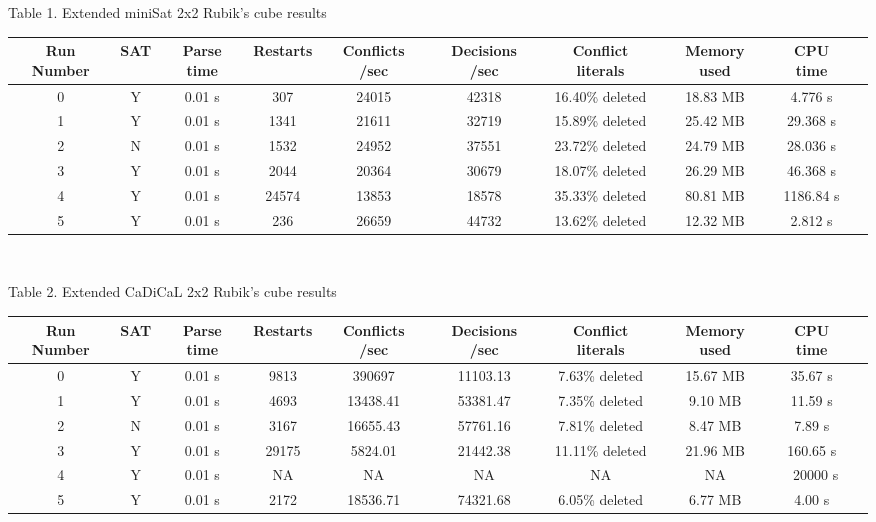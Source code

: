 \documentclass{article}
\begin{document}
\begin{center}
Table 1. Extended miniSat 2x2 Rubik's cube results \\[1mm]
\end{center}
\begin{adjustwidth}{-3.5cm}{}
\begin{tabular}{|c|c|c|c|c|c|c|c|c|c|}
\hline
Run Number & SAT & Parse time & Restarts & Conflicts /sec & Decisions /sec & Conflict literals & Memory used & CPU time \\
\hline
0 & Y & 0.01 s & 307 & 24015 & 42318 & 16.40\% deleted & 18.83 MB & 4.776 s \\
\hline
1 & Y & 0.01 s & 1341 & 21611 & 32719 & 15.89\% deleted & 25.42 MB & 29.368 s \\
\hline
2 & N & 0.01 s & 1532 & 24952 & 37551 & 23.72\% deleted & 24.79 MB & 28.036 s \\
\hline
3 & Y & 0.01 s & 2044 & 20364 & 30679 & 18.07\% deleted &  26.29 MB & 46.368 s \\
\hline
4 & Y & 0.01 s & 24574 & 13853 & 18578 & 35.33\% deleted & 80.81 MB & 1186.84 s \\
\hline
5 & Y & 0.01 s & 236 & 26659 & 44732 & 13.62\% deleted & 12.32 MB & 2.812 s \\
\hline
\end{tabular} \\[3mm]
\end{adjustwidth}

\begin{center}
Table 2. Extended CaDiCaL 2x2 Rubik's cube results \\[1mm]
\end{center}
\begin{adjustwidth}{-3.5cm}{}
\begin{tabular}{|c|c|c|c|c|c|c|c|c|c|}
\hline
Run Number & SAT & Parse time & Restarts & Conflicts /sec & Decisions /sec & Conflict literals & Memory used & CPU time \\
\hline
0 & Y & 0.01 s & 9813 & 390697 & 11103.13 & 7.63\% deleted & 15.67 MB & 35.67 s \\
\hline
1 & Y & 0.01 s & 4693 & 13438.41 & 53381.47 & 7.35\% deleted & 9.10 MB & 11.59 s \\
\hline
2 & N & 0.01 s & 3167 & 16655.43 & 57761.16 & 7.81\% deleted & 8.47 MB & 7.89 s \\
\hline
3 & Y & 0.01 s & 29175 & 5824.01 & 21442.38 & 11.11\% deleted & 21.96 MB & 160.65 s \\
\hline
4 & Y & 0.01 s & NA & NA & NA & NA & NA & $\>$ 20000 s \\
\hline
5 & Y & 0.01 s & 2172 & 18536.71 & 74321.68 & 6.05\% deleted & 6.77 MB & 4.00 s \\
\hline
\end{tabular}
\end{adjustwidth}
\end{document}
